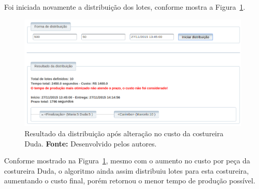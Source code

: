 \par Foi iniciada novamente a distribuição dos lotes, conforme mostra a
Figura~\ref{fig:resultado2_teste6}.

\newpage

\begin{figure}[h!]
	\centerline{\includegraphics[width=14.7cm]{./imagens/resultado2_teste6.png}}
	\caption[Resultado da distribuição após alteração no custo da costureira Duda.] 
	{Resultado da distribuição após alteração no custo da costureira Duda. \textbf{Fonte:} Desenvolvido pelos
	autores.}
	\label{fig:resultado2_teste6}
\end{figure}

\par Conforme mostrado na Figura~\ref{fig:resultado2_teste6}, mesmo com o
aumento no custo por peça da costureira Duda, o algoritmo ainda assim distribuiu
lotes para esta costureira, aumentando o custo final, porém retornou o
menor tempo de produção possível.
